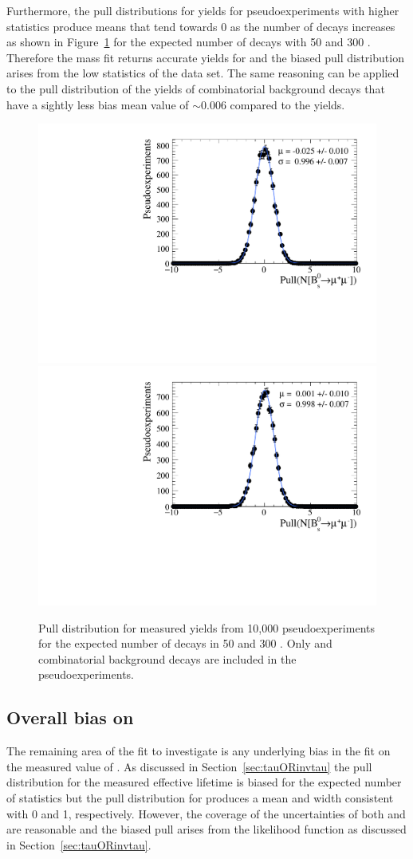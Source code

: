 Furthermore, the pull distributions for \bsmumu yields for pseudoexperiments with higher statistics produce means that tend towards 0 as the number of decays increases as shown in Figure~\ref{fig:BsmumuYieldPulls} for the expected number of decays with 50 and 300 \fb. Therefore the mass fit returns accurate yields for \bsmumu and the biased pull distribution arises from the low statistics of the data set. The same reasoning can be applied to the pull distribution of the yields of combinatorial background decays that have a sightly less bias mean value of $\sim0.006$ compared to the \bsmumu yields.

\begin{figure}[htbp]
    \centering
        \includegraphics[width=0.49 \textwidth]{./Figs/LifetimeSystematics/Bs2MuMu_yield_pull_50fb.pdf}
        \includegraphics[width=0.49 \textwidth]{./Figs/LifetimeSystematics/Bs2MuMu_yield_pull_300fb.pdf}
    \caption{Pull distribution for \bsmumu measured yields from 10,000 pseudoexperiments for the expected number of decays in 50 and 300 \fb. Only \bsmumu and combinatorial background decays are included in the pseudoexperiments.}
    \label{fig:BsmumuYieldPulls}
\end{figure}


\subsection{Overall bias on \tmumu}
The remaining area of the fit to investigate is any underlying bias in the fit on the measured value of \tmumu. As discussed in Section~\ref{sec:tauORinvtau} the pull distribution for the measured effective lifetime is biased for the expected number of statistics but the pull distribution for \Gmumu produces a mean and width consistent with 0 and 1, respectively. However, the coverage of the uncertainties of both \tmumu and \Gmumu are reasonable and the biased \tmumu pull arises from the likelihood function as discussed in Section~\ref{sec:tauORinvtau}. 

